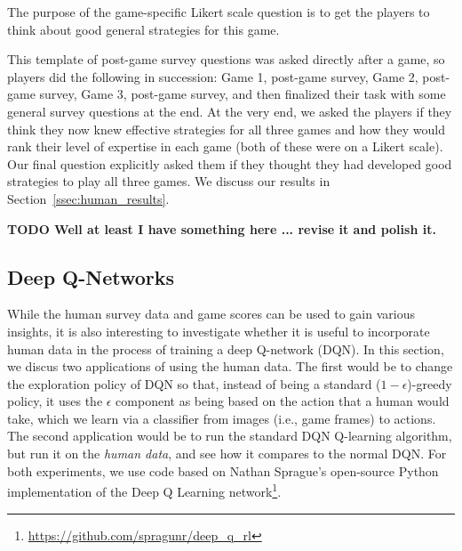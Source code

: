 \documentclass[letterpaper, 10 pt, conference]{ieeeconf}  %
\begin{document}
The purpose of the game-specific Likert scale question is to get the players to think about good
general strategies for this game.

This template of post-game survey questions was asked directly after a game, so players did the
following in succession: Game 1, post-game survey, Game 2, post-game survey, Game 3, post-game
survey, and then finalized their task with some general survey questions at the end. At the very
end, we asked the players if they think they now knew effective strategies for all three games and
how they would rank their level of expertise in each game (both of these were on a Likert scale).
Our final question explicitly asked them if they thought they had developed good strategies to play
all three games. We discuss our results in Section~\ref{ssec:human_results}.

\textbf{TODO Well at least I have something here ... revise it and polish it.}

\subsection{Deep Q-Networks}\label{ssec:dqn_experiment}

While the human survey data and game scores can be used to gain various insights, it is also
interesting to investigate whether it is useful to incorporate human data in the process of training
a deep Q-network (DQN). In this section, we discus two applications of using the human data. The
first would be to change the exploration policy of DQN so that, instead of being a standard
($1-\epsilon$)-greedy policy, it uses the $\epsilon$ component as being based on the action that a
human would take, which we learn via a classifier from images (i.e., game frames) to actions. The
second application would be to run the standard DQN Q-learning algorithm, but run it on the
\emph{human data}, and see how it compares to the normal DQN. For both experiments, we use code
based on Nathan Sprague's open-source Python implementation of the Deep Q Learning
network\footnote{\url{https://github.com/spragunr/deep_q_rl}}.
\end{document}
